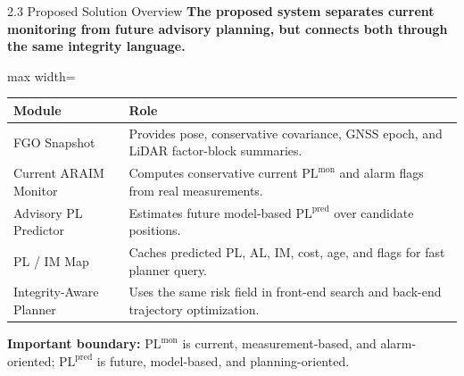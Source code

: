 \documentclass[10pt,aspectratio=169,xcolor=dvipsnames]{beamer}
\newcommand{\PL}{\mathrm{PL}}
\newcommand{\mon}{\mathrm{mon}}
\newcommand{\pred}{\mathrm{pred}}
\newcommand{\smalltable}[1]{\begin{adjustbox}{max width=\linewidth}\scriptsize#1\end{adjustbox}}
\begin{document}
\begin{frame}[t]{2.3 Proposed Solution Overview}
  \small
  \textbf{The proposed system separates current monitoring from future advisory planning, but connects both through the same integrity language.}
  \vspace{8mm}
  
  \smalltable{%
    \begin{tabular}{p{}p{0.73\textwidth}}
      \toprule
      \textbf{Module} & \textbf{Role}\\
      \midrule
      FGO Snapshot & Provides pose, conservative covariance, GNSS epoch, and LiDAR factor-block summaries.\\
      Current ARAIM Monitor & Computes conservative current $\PL^{\mon}$ and alarm flags from real measurements.\\
      Advisory PL Predictor & Estimates future model-based $\PL^{\pred}$ over candidate positions.\\
      PL / IM Map & Caches predicted PL, AL, IM, cost, age, and flags for fast planner query.\\
      Integrity-Aware Planner & Uses the same risk field in front-end search and back-end trajectory optimization.\\
      \bottomrule
  \end{tabular}}
  \vspace{1mm}
  {\scriptsize\color{BrickRed}\textbf{Important boundary:} $\PL^{\mon}$ is current, measurement-based, and alarm-oriented; $\PL^{\pred}$ is future, model-based, and planning-oriented.\par}
\end{frame}
\end{document}
